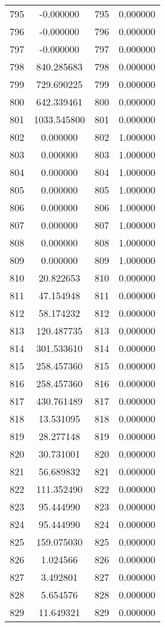 \documentclass[12pt]{article}
\begin{document}
\begin{longtable}{@{}cccc@{}}
795 & -0.000000 & 795 & 0.000000 \\
796 & -0.000000 & 796 & 0.000000 \\
797 & -0.000000 & 797 & 0.000000 \\
798 & 840.285683 & 798 & 0.000000 \\
799 & 729.690225 & 799 & 0.000000 \\
800 & 642.339461 & 800 & 0.000000 \\
801 & 1033.545800 & 801 & 0.000000 \\
802 & 0.000000 & 802 & 1.000000 \\
803 & 0.000000 & 803 & 1.000000 \\
804 & 0.000000 & 804 & 1.000000 \\
805 & 0.000000 & 805 & 1.000000 \\
806 & 0.000000 & 806 & 1.000000 \\
807 & 0.000000 & 807 & 1.000000 \\
808 & 0.000000 & 808 & 1.000000 \\
809 & 0.000000 & 809 & 1.000000 \\
810 & 20.822653 & 810 & 0.000000 \\
811 & 47.154948 & 811 & 0.000000 \\
812 & 58.174232 & 812 & 0.000000 \\
813 & 120.487735 & 813 & 0.000000 \\
814 & 301.533610 & 814 & 0.000000 \\
815 & 258.457360 & 815 & 0.000000 \\
816 & 258.457360 & 816 & 0.000000 \\
817 & 430.761489 & 817 & 0.000000 \\
818 & 13.531095 & 818 & 0.000000 \\
819 & 28.277148 & 819 & 0.000000 \\
820 & 30.731001 & 820 & 0.000000 \\
821 & 56.689832 & 821 & 0.000000 \\
822 & 111.352490 & 822 & 0.000000 \\
823 & 95.444990 & 823 & 0.000000 \\
824 & 95.444990 & 824 & 0.000000 \\
825 & 159.075030 & 825 & 0.000000 \\
826 & 1.024566 & 826 & 0.000000 \\
827 & 3.492801 & 827 & 0.000000 \\
828 & 5.654576 & 828 & 0.000000 \\
829 & 11.649321 & 829 & 0.000000 \\

\end{longtable}
\end{document}
